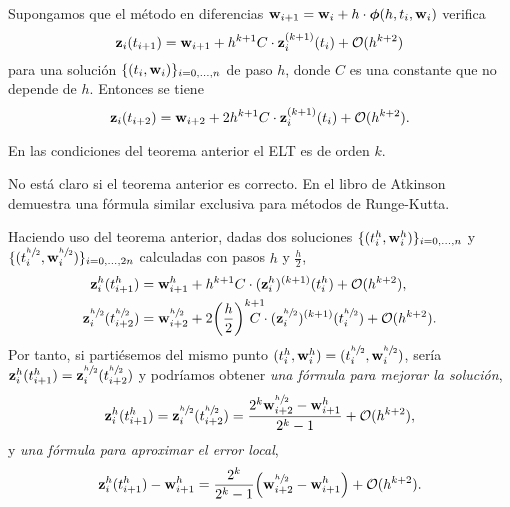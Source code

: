 \begin{theorem}
    \newcommand{\hh}{\sfrac{h}{2}}

    Supongamos que el método en diferencias 
    $\vb{w}{}_{i+1} = \vb{w}{}_i + h\cdot \vb*{\phi}{}(h, t_i, \vb{w}{}_i)$
    verifica
    \begin{equation*}\label{eq7}
        \vb{z}{}_i(t_{i+1}) =
        \vb{w}{}_{i+1} + h^{k+1}C\cdot \vb{z}{}_i^{(k+1)}(t_i) + \vb{\mathcal{O}}{}(h^{k+2})
    \end{equation*}
    para una solución $\{(t_i, \vb{w}{}_i)\}_{i = 0,\ldots,n}$ de paso $h$,
    donde $C$ es una constante que no depende de $h$.
    Entonces se tiene
    \begin{equation*}\label{eq8}
        \vb{z}{}_i(t_{i+2}) =
        \vb{w}{}_{i+2} + 2h^{k+1}C\cdot \vb{z}{}_i^{(k+1)}(t_i) + \vb{\mathcal{O}}{}(h^{k+2}).
    \end{equation*}
\end{theorem}

\begin{remark}
    En las condiciones del teorema anterior el ELT es de orden $k$.
\end{remark}

\begin{editorial}
    No está claro si el teorema anterior es correcto.
    En el libro de Atkinson demuestra una fórmula similar
    exclusiva para métodos de Runge-Kutta.
\end{editorial}

\newcommand{\hh}{\sfrac{h}{2}}

Haciendo uso del teorema anterior, dadas dos soluciones
$\{(t^h_i, \vb{w}{}^h_i)\}_{i = 0,\ldots,n}$ y
$\{(t^{\hh}_i, \vw^{\hh}_i)\}_{i = 0,\ldots,2n}$
calculadas con pasos $h$ y $\frac{h}{2}$,
\begin{align*}\label{eq8}
    \vz^{h}_i(t^{h}_{i+1}) &=
    \vw^{h}_{i+1} + h^{k+1}C\cdot (\vz^{h}_i)^{(k+1)}(t^{h}_i)
        + \vo(h^{k+2}), \\
    \vz^{\hh}_i(t^{\hh}_{i+2}) &=
    \vw^{\hh}_{i+2} + 2\qty(\frac{h}{2})^{k+1} \hspace{-4mm} C\cdot
        (\vz^{\hh}_i)^{(k+1)}(t^{\hh}_i) + \vo(h^{k+2}).
\end{align*}
Por tanto, si partiésemos del mismo punto
$(t^h_i, \vw^h_i) = (t^{\hh}_i, \vw^{\hh}_i)$,
sería $\vz^h_i(t^h_{i+1}) = \vz^{\hh}_i(t^{\hh}_{i+2})$
y podríamos obtener \emph{una fórmula para mejorar la solución},
\begin{equation*}
    \vz^h_i(t^h_{i+1}) = \vz^{\hh}_i(t^{\hh}_{i+2}) =
    \frac{2^k\vw^{\hh}_{i+2} - \vw^h_{i+1}}{2^k - 1} + \vo(h^{k+2}),
\end{equation*}
y \emph{una fórmula para aproximar el error local},
\begin{equation*}
    \vz^h_i(t^h_{i+1}) - \vw^h_{i+1} =
    \frac{2^k}{2^k-1}\qty(\vw^{\hh}_{i+2} - \vw^h_{i+1}) + \vo(h^{k+2}).
\end{equation*}

